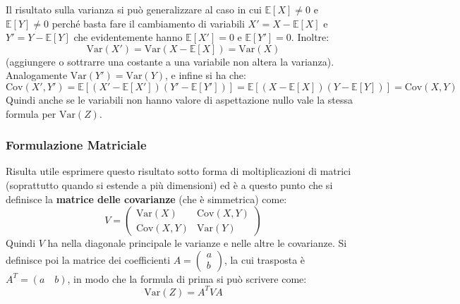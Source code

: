 \documentclass[openany,a4paper,12pt]{book}
\theoremstyle{remark}
\begin{document}
Il risultato sulla varianza si può generalizzare al caso in cui $\mathbb{E}[X] \neq 0$ e $\mathbb{E}[Y] \neq 0$ perché basta fare il cambiamento di variabili $X' = X - \mathbb{E}[X]$ e $Y' = Y - \mathbb{E}[Y]$ che evidentemente hanno $\mathbb{E}[X'] = 0$ e $\mathbb{E}[Y'] = 0$. Inoltre:
\begin{equation*}
    \text{Var}(X') = \text{Var}(X - \mathbb{E}[X]) = \text{Var}(X)
\end{equation*}
(aggiungere o sottrarre una costante a una variabile non altera la varianza). Analogamente $\text{Var}(Y') = \text{Var}(Y)$, e infine si ha che:
\begin{equation*}
    \text{Cov}(X', Y') = \mathbb{E}\left[ (X' - \mathbb{E}[X'])(Y' - \mathbb{E}[Y']) \right] = \mathbb{E}\left[ (X - \mathbb{E}[X])(Y - \mathbb{E}[Y]) \right] = \text{Cov}(X,Y)
\end{equation*}
Quindi anche se le variabili non hanno valore di aspettazione nullo vale la stessa formula per $\text{Var}(Z)$.

\subsubsection*{Formulazione Matriciale}
Risulta utile esprimere questo risultato sotto forma di moltiplicazioni di matrici (soprattutto quando si estende a più dimensioni) ed è a questo punto che si definisce la \textbf{matrice delle covarianze} (che è simmetrica) come:
\begin{equation}
    V = \begin{pmatrix}
    \text{Var}(X) & \text{Cov}(X,Y) \\
    \text{Cov}(X,Y) & \text{Var}(Y)
    \end{pmatrix}
\end{equation}
Quindi $V$ ha nella diagonale principale le varianze e nelle altre le covarianze. Si definisce poi la matrice dei coefficienti $A = \begin{pmatrix} a \\ b \end{pmatrix}$, la cui trasposta è $A^T = (a \quad b)$, in modo che la formula di prima si può scrivere come:
\begin{equation}
    \text{Var}(Z) = A^T V A
\end{equation}
\end{document}
